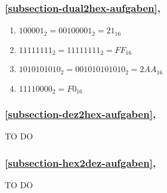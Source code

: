 \subsubsection{\autoref{subsection-dual2hex-aufgaben}, }

\begin{enumerate}
\item $100001_2  = 00100001_2 = 21_{16}$
\item $11111111_2 = 11111111_2 = FF_{16}$
\item $1010101010_2 = 001010101010_2 = 2AA_{16}$
\item $11110000_2 = F0_{16}$
\end{enumerate}

\subsubsection{\autoref{subsection-dez2hex-aufgaben}, }

TO DO

\subsubsection{\autoref{subsection-hex2dez-aufgaben}, }

TO DO